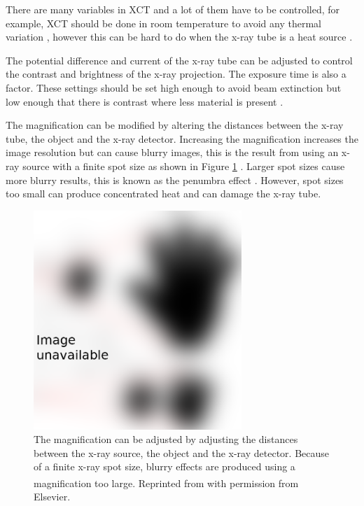 There are many variables in XCT and a lot of them have to be controlled, for example, XCT should be done in room temperature to avoid any thermal variation \citep{bryan1990international}, however this can be hard to do when the x-ray tube is a heat source \citep{kruth2011computed}.

The potential difference and current of the x-ray tube can be adjusted to control the contrast and brightness of the x-ray projection. The exposure time is also a factor. These settings should be set high enough to avoid beam extinction but low enough that there is contrast where less material is present \citep{kruth2011computed}.

The magnification can be modified by altering the distances between the x-ray tube, the object and the x-ray detector. Increasing the magnification increases the image resolution but can cause blurry images, this is the result from using an x-ray source with a finite spot size as shown in Figure \ref{fig:literature_magnification} \citep{kruth2011computed}. Larger spot sizes cause more blurry results, this is known as the penumbra effect \citep{kueh2016modelling}. However, spot sizes too small can produce concentrated heat \citep{welkenhuyzen2009industrial} and can damage the x-ray tube.

\begin{figure}
  \centering
  \includegraphics[width=0.7\textwidth]{../figures/literatureReview/literature_magnification.png}
  \caption{The magnification can be adjusted by adjusting the distances between the x-ray source, the object and the x-ray detector. Because of a finite x-ray spot size, blurry effects are produced using a magnification too large. Reprinted from \cite{kruth2011computed}\textsuperscript{\textcopyright} with permission from Elsevier.}
  \label{fig:literature_magnification}
\end{figure}


